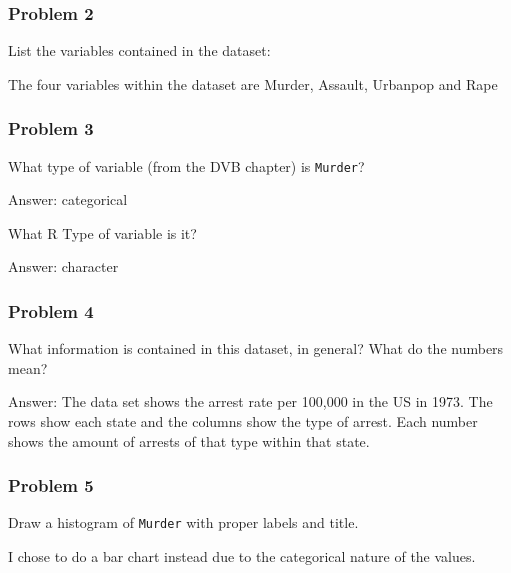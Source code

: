 \documentclass[
]{article}
\newenvironment{Shaded}{\begin{snugshade}}{\end{snugshade}}
\newcommand{\DataTypeTok}[1]{\textcolor[rgb]{0.13,0.29,0.53}{#1}}
\newcommand{\DecValTok}[1]{\textcolor[rgb]{0.00,0.00,0.81}{#1}}
\newcommand{\KeywordTok}[1]{\textcolor[rgb]{0.13,0.29,0.53}{\textbf{#1}}}
\newcommand{\NormalTok}[1]{#1}
\newcommand{\OperatorTok}[1]{\textcolor[rgb]{0.81,0.36,0.00}{\textbf{#1}}}
\newcommand{\StringTok}[1]{\textcolor[rgb]{0.31,0.60,0.02}{#1}}
\begin{document}
\hypertarget{problem-2}{%
\subsubsection{Problem 2}\label{problem-2}}

List the variables contained in the dataset:

The four variables within the dataset are Murder, Assault, Urbanpop and
Rape

\hypertarget{problem-3}{%
\subsubsection{Problem 3}\label{problem-3}}

What type of variable (from the DVB chapter) is \texttt{Murder}?

Answer: categorical

What R Type of variable is it?

Answer: character

\hypertarget{problem-4}{%
\subsubsection{Problem 4}\label{problem-4}}

What information is contained in this dataset, in general? What do the
numbers mean?

Answer: The data set shows the arrest rate per 100,000 in the US in
1973. The rows show each state and the columns show the type of arrest.
Each number shows the amount of arrests of that type within that state.

\hypertarget{problem-5}{%
\subsubsection{Problem 5}\label{problem-5}}

Draw a histogram of \texttt{Murder} with proper labels and title.

I chose to do a bar chart instead due to the categorical nature of the
values.

\begin{Shaded}
\end{Shaded}
\end{document}
